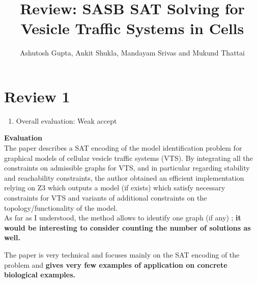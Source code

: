 \documentclass{llncs}
\begin{document}
\title{Review: SASB SAT Solving for Vesicle Traffic Systems in Cells} 

\author{Ashutosh Gupta, Ankit Shukla, Mandayam Srivas and Mukund Thattai}

\maketitle         

\section{Review 1}
\begin{enumerate}
\item {Overall evaluation: Weak accept\\}
\end{enumerate}
\textbf{{\color{black} Evaluation\\}}
The paper describes a SAT encoding of the model identification problem for graphical
models of cellular vesicle traffic systems (VTS).
By integrating all the constraints on admissible graphs for VTS, and in particular
regarding stability and reachability constraints, the author obtained an efficient
implementation relying on Z3 which outputs a model (if exists) which satisfy
necessary constraints for VTS and variants of additional constraints on the
topology/functionality of the model.\\



As far as I understood, the method allows to identify one graph (if any) ; \textbf{it would be interesting to consider counting the number of solutions as well.}\newline
{\color{red}{done.}}

The paper is very technical and focuses mainly on the SAT encoding of the problem
and \textbf{gives very few examples of application on concrete biological examples.}\\ 
{\color{red}{Ankit\\}}
\end{document}
